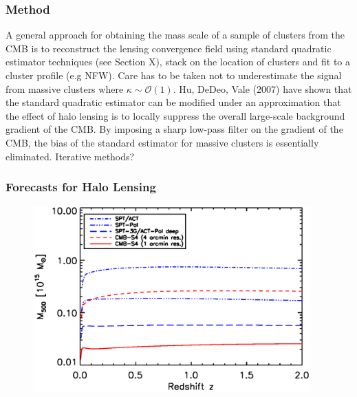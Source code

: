 \subsubsection{Method}

A general approach for obtaining the mass scale of a sample of clusters from the CMB is to reconstruct the lensing convergence field using standard quadratic estimator techniques (see Section X), stack on the location of clusters and fit to a cluster profile (e.g NFW). Care has to be taken not to underestimate the signal from massive clusters where $\kappa\sim\mathcal{O}(1)$. Hu, DeDeo, Vale (2007) have shown that the standard quadratic estimator can be modified under an approximation that the effect of halo lensing is to locally suppress the overall large-scale background gradient of the CMB. By imposing a sharp low-pass filter on the gradient of the CMB, the bias of the standard estimator for massive clusters is essentially eliminated. Iterative methods?

\subsubsection{Forecasts for Halo Lensing}\label{haloLensForecast}

\begin{figure}[h]
\includegraphics[width=0.95\textwidth]{CMBLensing/m500lim_vs_z_1sigma_cmbs4_v1}
\caption{}
\end{figure}

